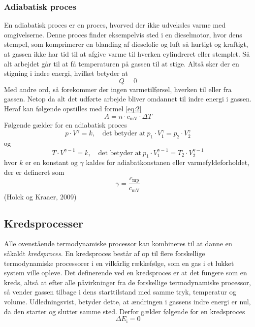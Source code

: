 \documentclass[SRC.tex]{subfiles}
\begin{document}
	\subsubsection{Adiabatisk proces}
	En adiabatisk proces er en proces, hvorved der ikke udveksles varme med 
	omgivelserne. Denne proces finder eksempelvis sted i en dieselmotor, hvor dens 
	stempel, som komprimerer en blanding af dieselolie og luft så hurtigt og kraftigt,
	at gassen ikke har tid til at afgive varme til hverken cylindreret eller stemplet. Så alt arbejdet går til at få temperaturen på gassen til at stige. Altså sker der en stigning i indre energi, hvilket betyder at 
	\begin{equation}
	Q = 0
	\end{equation}
	Med andre ord, så forekommer der ingen varmetilførsel, hverken til eller fra gassen. Netop da 
	alt det udførte arbejde bliver omdannet til indre energi i gassen. Heraf kan
	følgende opstilles med formel \eqref{eq:2}
	\begin{equation}
	A = n \cdot c_{\text{mV}} \cdot \Delta T 
	\end{equation}
	Følgende gælder for en adiabatisk proces
	\begin{equation}
	p \cdot V^\gamma = k,\quad \text{det betyder at}\ p_1 \cdot V_1^\gamma= p_2 \cdot V_2^\gamma
	\end{equation}
	og 
	\begin{equation}
	T \cdot V^{\gamma-1} = k,\quad \text{det betyder at}\ p_1 \cdot V_1^{\gamma-1}= T_2 \cdot V_2^{\gamma-1}
	\end{equation}
	hvor \(k\) er en konstant og \(\gamma\) kaldes
	for adiabatkonstanen eller varmefyldeforholdet, der er defineret som
	\begin{equation}
	\gamma = \frac{c_{\textrm{mp}}}{c_{\textrm{mV}}}
	\end{equation}
	(Holck og Kraaer, 2009)
	\subsection{Kredsprocesser}
	Alle ovenstående termodynamiske processor kan kombineres til at danne
	en såkaldt \textit{kredsproces}. En kredsproces består af op til flere 
	forskellige termodynamiske processorer i en vilkårlig rækkefølge, som en gas i 
	et lukket system ville opleve. Det definerende ved en kredsproces er at det fungere som en kreds, altså at efter alle påvirkninger
	fra de forskellige termodynamiske processor, så vender gassen tilbage i dens starttilstand med
	samme tryk, temperatur og volume. Udledningsvist, betyder dette, at ændringen 
	i gassens indre energi er nul, da den starter og slutter samme sted. Derfor gælder følgende for en kredsproces
	\begin{equation}
	\Delta E_\text{i} = 0
	\end{equation} 
\end{document}
